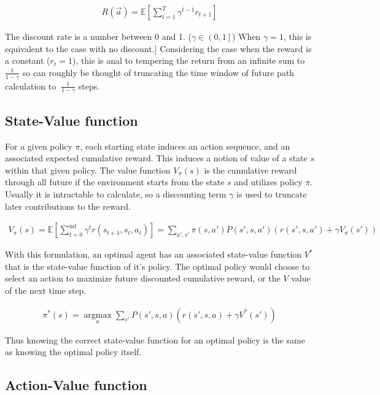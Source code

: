 \documentclass[../dissertation.tex]{subfiles}
\begin{document}
\begin{align}
    \label{eqn:returnDefDisc}
    R(\vec{a}) = \mathbb{E} \left[ \sum_{t=1}^{T} \gamma^{t-1} r_{t+1} \right]
\end{align}

The discount rate is a number between 0 and 1. ($\gamma \in \left( 0 , 1 \right]$)
When $\gamma = 1$, this is equivalent to the case with no discount.]
Considering the case when the reward is a constant ($r_t = 1$), this is anal to tempering the return from an infinite sum to $\frac{1}{1 - \gamma}$ so can roughly be thought of truncating the time window of future path calculation to $~\frac{1}{1 - \gamma}$ steps.

\subsection{State-Value function}

For a given policy $\pi$, each starting state induces an action sequence, and an associated expected cumulative reward.
This induces a notion of value of a state $s$ within that given policy.
The value function $V_{\pi}(s)$ is the cumulative reward through all future if the environment starts from the state $s$ and utilizes policy $\pi$.
Usually it is intractable to calculate, so a discounting term $\gamma$ is used to truncate later contributions to the reward.

\begin{align}
    \label{eqn:state-value}
    V_\pi(s) = \mathbb{E} \left[
        \sum_{t=0}^{\inf} \gamma^{t} r(s_{t+1}, s_t, a_t)
    \right]
    =   \sum_{a', s'} \pi(s, a') P(s', s, a') \left( r(s', s, a') + \gamma V_{\pi}(s') \right)
\end{align}

With this formulation, an optimal agent has an associated state-value function $V^*$ that is the state-value function of it's policy.
The optimal policy would choose to select an action to maximize future discounted cumulative reward, or the $V$ value of the next time step.

\begin{align}
    \label{eqn:state-optV}
    \pi^*(s) = \operatorname*{argmax}_a \sum_{s'} P(s', s, a) \left( r(s', s, a) + \gamma V^*(s') \right)
\end{align}

Thus knowing the correct state-value function for an optimal policy is the same as knowing the optimal policy itself.

\subsection{Action-Value function}
\end{document}
